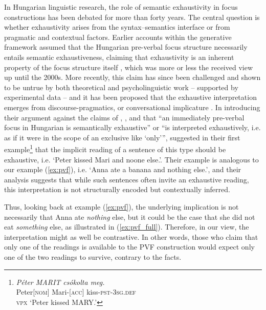 \documentclass[ruler]{CUP-JNL-LIN}%
\begin{document}
In Hungarian linguistic research, the role of semantic exhaustivity in focus constructions has been debated for more than forty years. The central question is whether exhaustivity arises from the syntax–semantics interface or from pragmatic and contextual factors. Earlier accounts within the generative framework assumed that the Hungarian pre-verbal focus structure necessarily entails semantic exhaustiveness, claiming that exhaustivity is an inherent property of the focus structure itself \citep{szabolcsi_1981_compositionality,ekiss_1998_identificational,ekiss_2007_topic,kenesei_2006_focus,horvath_2008_separating}, which was more or less  the received view up until the 2000s. More recently, this claim has since been challenged and shown to be untrue by both theoretical and psycholinguistic work -- supported by experimental data -- and it has been proposed that the exhaustive interpretation emerges from discourse-pragmatics, or conversational implicature \citep{wedgwood_2006_hungarian,onea_2009_exhaustiveness,balogh_2013_hungarian,kaldi_2016_magyar}. In introducing their argument against the claims of \citet{szabolcsi_1981_compositionality}, \citet{ekiss_1998_identificational,ekiss_2007_topic}, and \citet{horvath_2008_separating} that \enquote{an immediately pre-verbal focus in Hungarian is semantically exhaustive} or \enquote{is interpreted exhaustively, i.e. as if it were in the scope of an exclusive like \enquote{only}}, \citet[1]{onea_2009_hungarian} suggested in their first example\footnote{\textit{Péter MARIT csókolta meg.} \\ Peter\textsc{[nom]} Mari-[\textsc{acc}] kiss-\textsc{pst-3sg.def} \\ \textsc{vpx} `Peter kissed MARY.'} that the implicit reading of a sentence of this type should be exhaustive, i.e. `Peter kissed Mari and noone else.'. Their example is analogous to our example (\ref{ex:pvf}), i.e. `Anna ate a banana and nothing else.', and their analysis suggests that while such sentences often invite an exhaustive reading, this interpretation is not structurally encoded but contextually inferred.


Thus, looking back at example (\ref{ex:pvf}), the underlying implication is not necessarily that Anna ate \textit{nothing} else, but it could be the case that she did not eat \textit{something} else, as illustrated in (\ref{ex:pvf_full}). Therefore, in our view, the interpretation might as well be contrastive. In other words, those who claim that only one of the readings is available to the PVF construction would expect only one of the two readings to survive, contrary to the facts.
\end{document}
